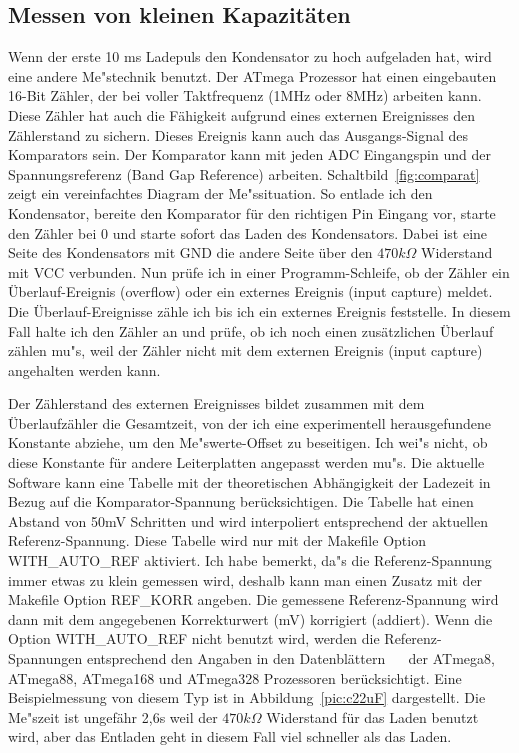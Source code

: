 \subsection{Messen von kleinen Kapazit\"aten}
Wenn der erste 10 ms Ladepuls den Kondensator zu hoch aufgeladen hat, wird eine andere Me"stechnik benutzt.
Der ATmega Prozessor hat einen eingebauten 16-Bit Z\"ahler, der bei voller Taktfrequenz (1MHz oder 8MHz) arbeiten kann.
Diese Z\"ahler hat auch die F\"ahigkeit aufgrund eines externen Ereignisses den Z\"ahlerstand zu sichern.
Dieses Ereignis kann auch das Ausgangs-Signal des Komparators sein.
Der Komparator kann mit jeden ADC Eingangspin und der Spannungsreferenz (Band Gap Reference) arbeiten.
Schaltbild~\ref{fig:comparat} zeigt ein vereinfachtes Diagram der Me"ssituation.
So entlade ich den Kondensator, bereite den Komparator f\"ur den richtigen Pin Eingang vor, starte den Z\"ahler bei 0 und
starte sofort das Laden des Kondensators.
Dabei ist eine Seite des Kondensators mit GND die andere Seite \"uber den \(470k\Omega\) Widerstand mit VCC verbunden.
Nun pr\"ufe ich in einer Programm-Schleife, ob der Z\"ahler ein \"Uberlauf-Ereignis (overflow) oder ein
 externes Ereignis (input capture) meldet.
Die \"Uberlauf-Ereignisse z\"ahle ich bis ich ein externes Ereignis feststelle.
In diesem Fall halte ich den Z\"ahler an und pr\"ufe, ob ich noch einen zus\"atzlichen \"Uberlauf z\"ahlen mu"s, 
weil der Z\"ahler nicht mit dem externen Ereignis (input capture) angehalten werden kann.


Der Z\"ahlerstand des externen Ereignisses bildet zusammen mit dem \"Uberlaufz\"ahler die Gesamtzeit,
von der ich eine experimentell herausgefundene Konstante abziehe, um den Me"swerte-Offset zu beseitigen.
Ich wei"s nicht, ob diese Konstante f\"ur andere Leiterplatten angepasst werden mu"s.
Die aktuelle Software kann eine Tabelle mit der theoretischen Abh\"angigkeit der Ladezeit in Bezug auf die Komparator-Spannung ber\"ucksichtigen.
Die Tabelle hat einen Abstand von 50mV Schritten und wird interpoliert entsprechend der aktuellen Referenz-Spannung.
Diese Tabelle wird nur mit der Makefile Option WITH\_AUTO\_REF aktiviert.
Ich habe bemerkt, da"s die Referenz-Spannung immer etwas zu klein gemessen wird,
 deshalb kann man einen Zusatz mit der Makefile Option REF\_KORR angeben.
Die gemessene Referenz-Spannung wird dann mit dem angegebenen Korrekturwert (mV) korrigiert (addiert).
Wenn die Option WITH\_AUTO\_REF nicht benutzt wird, werden die Referenz-Spannungen entsprechend den Angaben in den
Datenbl\"attern ~\cite{ATmega8}~\cite{ATmega168} der ATmega8, ATmega88, ATmega168 und ATmega328 Prozessoren ber\"ucksichtigt.
Eine Beispielmessung von diesem Typ ist in Abbildung~\ref{pic:c22uF} dargestellt.
Die Me"szeit ist ungef\"ahr 2,6s weil der \(470k\Omega\) Widerstand f\"ur das Laden benutzt wird,
aber das Entladen geht in diesem Fall viel schneller als das Laden.

